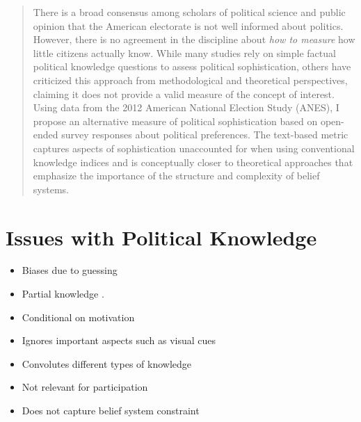 \documentclass[a0,landscape]{a0poster}
\begin{document}
\begin{multicols}{4} %

\color{Navy} %
\begin{abstract}
There is a broad consensus among scholars of political science and public opinion that the American electorate is not well informed about politics. However, there is no agreement in the discipline about \textit{how to measure} how little citizens actually know. While many studies rely on simple factual political knowledge questions to assess political sophistication, others have criticized this approach from methodological and theoretical perspectives, claiming it does not provide a valid measure of the concept of interest. Using data from the 2012 American National Election Study (ANES), I propose an alternative measure of political sophistication based on open-ended survey responses about political preferences. The text-based metric captures aspects of sophistication unaccounted for when using conventional knowledge indices and is conceptually closer to theoretical approaches that emphasize the importance of the structure and complexity of belief systems.
\end{abstract}

\color{SaddleBrown} %
\section*{Issues with Political Knowledge}
\begin{itemize}
   \item Biases due to guessing \citep[e.g.][]{mondak2004knowledge}
   \item Partial knowledge \citep[e.g.][]{debell2013harder}.
   \item Conditional on motivation \citep[e.g.][]{prior2008money}
   \item Ignores important aspects such as visual cues \citep{prior2014visual}
   \item Convolutes different types of knowledge \citep{barabas2014question}
   \item Not relevant for participation \citep{lupia2006elitism}
   \item Does not capture belief system constraint \citep{luskin1987measuring,tetlock1983cognitive}
\end{itemize}


\end{multicols}
\end{document}
